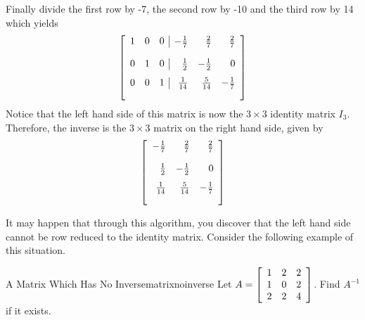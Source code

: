 \begin{solution}
Finally divide the first row by -7, the second row by -10 and the third row
by 14 which yields
\begin{equation*}
\leftB 
\begin{array}{rrr|rrr}
1 & 0 & 0 & -\vspace{0.05in}\frac{1}{7} & \vspace{0.05in}\frac{2}{7} & \vspace{0.05in}\frac{2}{7} \\
0 & 1 & 0 & \vspace{0.05in}\frac{1}{2} & -\vspace{0.05in}\frac{1}{2} & 0
\\
0 & 0 & 1 & \vspace{0.05in}\frac{1}{14} & \vspace{0.05in}\frac{5}{14} & -
\vspace{0.05in}\frac{1}{7}
\end{array}
\rightB 
\end{equation*}
Notice that the left hand side of this matrix is now the $3 \times 3$ identity matrix $I_3$. 
Therefore, the inverse is the $3 \times 3$ matrix on the right hand side, given by
\begin{equation*}
\leftB
\begin{array}{rrr}
-\vspace{0.05in}\frac{1}{7} & \vspace{0.05in}\frac{2}{7} & \vspace{0.05in}
\frac{2}{7} \\
\vspace{0.05in}\frac{1}{2} & -\vspace{0.05in}\frac{1}{2} & 0 \\
\vspace{0.05in}\frac{1}{14} & \vspace{0.05in}\frac{5}{14} & -\vspace{0.05in}
\frac{1}{7}
\end{array}
\rightB
\end{equation*}
\end{solution}

It may happen that through this algorithm, you discover that the left hand side cannot 
be row reduced to the identity matrix. Consider the following example of this situation. 

\begin{example}{A Matrix Which Has No Inverse}{matrixnoinverse}
Let $A=\left[
\begin{array}{rrr}
1 & 2 & 2 \\
1 & 0 & 2 \\
2 & 2 & 4
\end{array}
\right] $. Find $A^{-1}$ if it exists.
\end{example}

